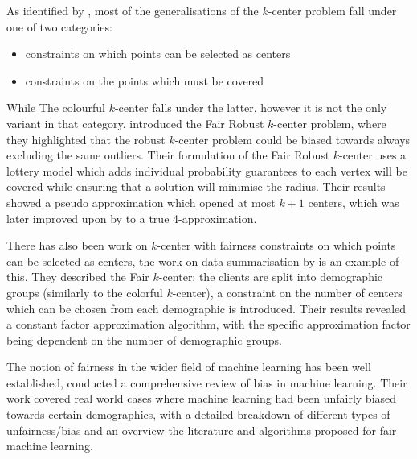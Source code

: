 As identified by \textcite{anegg_technique_2020}, most of the generalisations of the $k$-center problem fall under one of two categories:
\begin{itemize}
    \item constraints on which points can be selected as centers
    \item constraints on the points which must be covered
\end{itemize}
While The colourful $k$-center falls under the latter, however it is not the only variant in that category. \textcite{harris_lottery_2017} introduced the Fair Robust $k$-center problem, where they highlighted that the robust $k$-center problem could be biased towards always excluding the same outliers. Their formulation of the Fair Robust $k$-center uses a lottery model which adds individual probability guarantees to each vertex will be covered while ensuring that a solution will minimise the radius. Their results showed a pseudo approximation which opened at most $k+1$ centers, which was later improved upon by \textcite{anegg_technique_2020} to a true 4-approximation.

There has also been work on $k$-center with fairness constraints on which points can be selected as centers, the work on data summarisation by \textcite{kleindessner_fair_2019} is an example of this. They described the Fair $k$-center; the clients are split into demographic groups (similarly to the colorful $k$-center), a constraint on the number of centers which can be chosen from each demographic is introduced. Their results revealed a constant factor approximation algorithm, with the specific approximation factor being dependent on the number of demographic groups. 

The notion of fairness in the wider field of machine learning has been well established, \textcite{mehrabi_survey_2019} conducted a comprehensive review of bias in machine learning. Their work covered real world cases where machine learning had been unfairly biased towards certain demographics, with a detailed breakdown of different types of unfairness/bias and an overview the literature and algorithms proposed for fair machine learning.